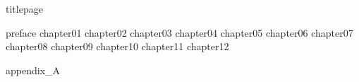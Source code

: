 \documentclass[
	,a4paper
	,12pt
	,oneside
]{book}
\begin{document}
\frontmatter
	{titlepage}
	\restoregeometry
	\tableofcontents

\mainmatter
    
	{preface}
	{chapter01}
	{chapter02}
	{chapter03}
	{chapter04}
	{chapter05}
	{chapter06}
	{chapter07}
	{chapter08}
	{chapter09}
	{chapter10}
	{chapter11}
	{chapter12}
	
	\appendix
	{appendix_A}

\backmatter
\end{document}
